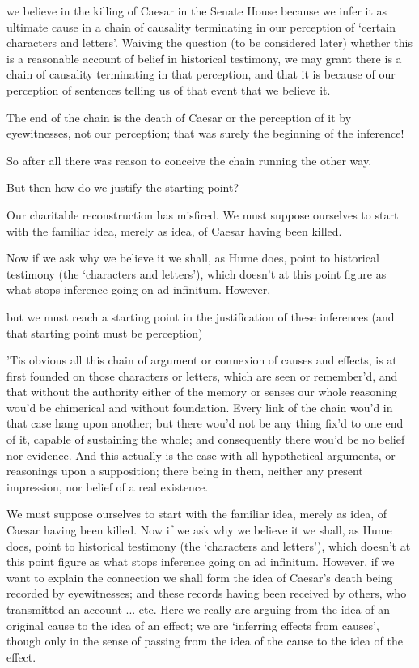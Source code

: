 we believe in the killing of Caesar in the Senate House because we infer it as
ultimate cause in a chain of causality terminating in our perception of ‘certain
characters and letters’. Waiving the question (to be considered later) whether
this is a reasonable account of belief in historical testimony, we may grant
there is a chain of causality terminating in that perception, and that it is
because of our perception of sentences telling us of that event that we believe
it.

The end of the chain is the death of Caesar or the perception of it by
eyewitnesses, not our perception; that was surely the beginning of the
inference!

So after all there was reason to conceive the chain running the other way.

But then how do we justify the starting point?

Our charitable reconstruction has misfired. We must suppose ourselves to start
with the familiar idea, merely as idea, of Caesar having been killed.

Now if we ask why we believe it we shall, as Hume does, point to historical
testimony (the ‘characters and letters’), which doesn’t at this point figure as
what stops inference going on ad infinitum. However,

but we must reach a starting point in the justification of these inferences (and
that starting point must be perception)

’Tis obvious all this chain of argument or connexion of causes and effects, is
at first founded on those characters or letters, which are seen or remember’d,
and that without the authority either of the memory or senses our whole
reasoning wou’d be chimerical and without foundation. Every link of the chain
wou’d in that case hang upon another; but there wou’d not be any thing fix’d to
one end of it, capable of sustaining the whole; and consequently there wou’d be
no belief nor evidence. And this actually is the case with all hypothetical
arguments, or reasonings upon a supposition; there being in them, neither any
present impression, nor belief of a real existence.

We must suppose ourselves to start with the familiar idea, merely as idea, of
Caesar having been killed. Now if we ask why we believe it we shall, as Hume
does, point to historical testimony (the ‘characters and letters’), which
doesn’t at this point figure as what stops inference going on ad infinitum.
However, if we want to explain the connection we shall form the idea of Caesar’s
death being recorded by eyewitnesses; and these records having been received by
others, who transmitted an account ... etc. Here we really are arguing from the
idea of an original cause to the idea of an effect; we are ‘inferring effects
from causes’, though only in the sense of passing from the idea of the cause to
the idea of the effect.

